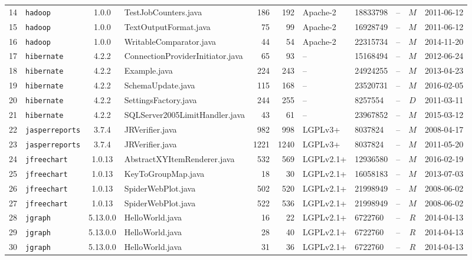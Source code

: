 \documentclass{sig-alternate-05-2015}
\begin{document}
\begin{table}
{\begin{tabular}{r|l|c|p{4.5cm}|r|r|l|l|l|c|l}
			14 & \texttt{hadoop} & 1.0.0 & TestJobCounters.java  & 186 & 192 & Apache-2 & 18833798 & -- & $M$  & 2011-06-12 \\
			15 & \texttt{hadoop} & 1.0.0 & TextOutputFormat.java  & 75 & 99 & Apache-2 & 16928749 & -- & $M$  & 2011-06-12 \\
			16 & \texttt{hadoop} & 1.0.0 & WritableComparator.java  & 44 & 54 & Apache-2 & 22315734 & -- & $M$  & 2014-11-20 \\
			17 & \texttt{hibernate} & 4.2.2 & ConnectionProviderInitiator.java  & 65 & 93 & -- & 15168494 & -- & $M$  & 2012-06-24 \\
			18 & \texttt{hibernate} & 4.2.2 & Example.java  & 224 & 243 & -- & 24924255 & -- & $M$  & 2013-04-23 \\
			19 & \texttt{hibernate} & 4.2.2 & SchemaUpdate.java  & 115 & 168 & -- & 23520731 & -- & $M$  & 2016-02-05 \\
			20 & \texttt{hibernate} & 4.2.2 & SettingsFactory.java  & 244 & 255 & -- & 8257554 & -- & $D$  & 2011-03-11 \\
			21 & \texttt{hibernate} & 4.2.2 & SQLServer2005LimitHandler.java  & 43 & 61 & -- & 23967852 & -- & $M$  & 2015-03-12 \\
			22 & \texttt{jasperreports} & 3.7.4 & JRVerifier.java  & 982 & 998 & LGPLv3+ & 8037824 & -- & $M$  & 2008-04-17 \\
			23 & \texttt{jasperreports} & 3.7.4 & JRVerifier.java  & 1221 & 1240 & LGPLv3+ & 8037824 & -- & $M$  & 2011-05-20 \\
			24 & \texttt{jfreechart} & 1.0.13 & AbstractXYItemRenderer.java  & 532 & 569 & LGPLv2.1+ & 12936580 & -- & $M$  & 2016-02-19 \\
			25 & \texttt{jfreechart} & 1.0.13 & KeyToGroupMap.java  & 18 & 30 & LGPLv2.1+ & 16058183 & -- & $M$  & 2013-07-03 \\
			26 & \texttt{jfreechart} & 1.0.13 & SpiderWebPlot.java  & 502 & 520 & LGPLv2.1+ & 21998949 & -- & $M$  & 2008-06-02 \\
			27 & \texttt{jfreechart} & 1.0.13 & SpiderWebPlot.java  & 522 & 536 & LGPLv2.1+ & 21998949 & -- & $M$  & 2008-06-02 \\
			28 & \texttt{jgraph} & 5.13.0.0 & HelloWorld.java  & 16 & 22 & LGPLv2.1+ & 6722760 & -- & $R$  & 2014-04-13 \\
			29 & \texttt{jgraph} & 5.13.0.0 & HelloWorld.java  & 28 & 40 & LGPLv2.1+ & 6722760 & -- & $R$  & 2014-04-13 \\
			30 & \texttt{jgraph} & 5.13.0.0 & HelloWorld.java  & 31 & 36 & LGPLv2.1+ & 6722760 & -- & $R$  & 2014-04-13 \\

\end{tabular}}
\end{table}
\end{document}

